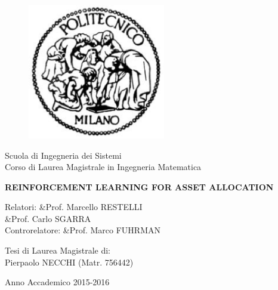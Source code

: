 \begin{titlepage}

	\begin{figure}[htpb]
		\centering
		\includegraphics[width=6cm]{Cover/PolimiLogo}
	\end{figure}

	\begin{center}
		\normalsize 
			Scuola di Ingegneria dei Sistemi\\
      Corso di Laurea Magistrale in Ingegneria Matematica\\
      \vspace{0.5cm}
  	\vspace{1cm}
	\end{center}
	
	\begin{center}
		\LARGE
			\textbf{REINFORCEMENT LEARNING FOR ASSET ALLOCATION}
		\vspace{1.5cm}
	\end{center}

	\begin{flushleft}
		\Large
			Relatori: &Prof. Marcello RESTELLI\\
					  &Prof. Carlo SGARRA\\
			Controrelatore: &Prof. Marco FUHRMAN\\
			\vspace{1.5cm}
	\end{flushleft}
	
	\begin{flushright}
		\Large
		Tesi di Laurea Magistrale di:\\
		Pierpaolo NECCHI  (Matr. 756442)\\		
		\vspace{1.5cm}
	\end{flushright}
	
	\vspace*{\fill}
	\begin{center}
		Anno Accademico 2015-2016
	\end{center}
	
\end{titlepage}
